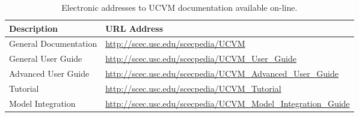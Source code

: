 
\begin{table*}[t]
\centering
\small
\caption{Electronic addresses to UCVM documentation available on-line.}
\begin{tabular}[]{ll}
\\
Description                 & URL Address                                                         \\
\hline
General Documentation       & \url{http://scec.usc.edu/scecpedia/UCVM}                            \\
General User Guide          & \url{http://scec.usc.edu/scecpedia/UCVM_User_Guide}                 \\
Advanced User Guide         & \url{http://scec.usc.edu/scecpedia/UCVM_Advanced_User_Guide}        \\
Tutorial                    & \url{http://scec.usc.edu/scecpedia/UCVM_Tutorial}                   \\
Model Integration           & \url{http://scec.usc.edu/scecpedia/UCVM_Model_Integration_Guide}    \\
\hline
\end{tabular}
\label{tab:manuals}
\end{table*}
